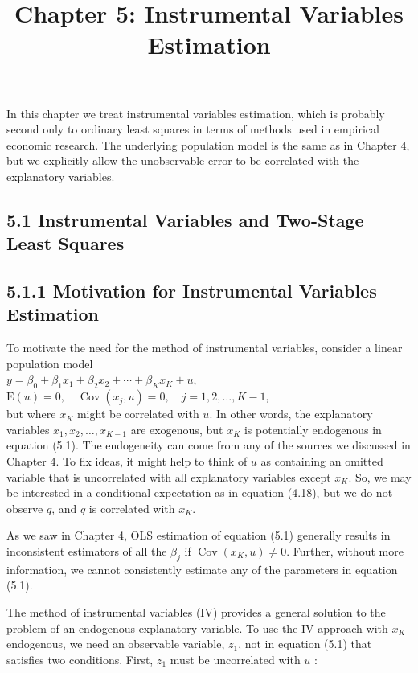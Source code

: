 \documentclass[10pt]{article}
\title{Chapter 5: Instrumental Variables Estimation}
\author{}
\date{}
\begin{document}
\maketitle

In this chapter we treat instrumental variables estimation, which is probably second only to ordinary least squares in terms of methods used in empirical economic research. The underlying population model is the same as in Chapter 4, but we explicitly allow the unobservable error to be correlated with the explanatory variables.

\subsection*{5.1 Instrumental Variables and Two-Stage Least Squares}
\subsection*{5.1.1 Motivation for Instrumental Variables Estimation}
To motivate the need for the method of instrumental variables, consider a linear population model\\
$y=\beta_{0}+\beta_{1} x_{1}+\beta_{2} x_{2}+\cdots+\beta_{K} x_{K}+u$,\\
$\mathrm{E}(u)=0, \quad \operatorname{Cov}\left(x_{j}, u\right)=0, \quad j=1,2, \ldots, K-1$,\\
but where $x_{K}$ might be correlated with $u$. In other words, the explanatory variables $x_{1}, x_{2}, \ldots, x_{K-1}$ are exogenous, but $x_{K}$ is potentially endogenous in equation (5.1). The endogeneity can come from any of the sources we discussed in Chapter 4. To fix ideas, it might help to think of $u$ as containing an omitted variable that is uncorrelated with all explanatory variables except $x_{K}$. So, we may be interested in a conditional expectation as in equation (4.18), but we do not observe $q$, and $q$ is correlated with $x_{K}$.

As we saw in Chapter 4, OLS estimation of equation (5.1) generally results in inconsistent estimators of all the $\beta_{j}$ if $\operatorname{Cov}\left(x_{K}, u\right) \neq 0$. Further, without more information, we cannot consistently estimate any of the parameters in equation (5.1).

The method of instrumental variables (IV) provides a general solution to the problem of an endogenous explanatory variable. To use the IV approach with $x_{K}$ endogenous, we need an observable variable, $z_{1}$, not in equation (5.1) that satisfies two conditions. First, $z_{1}$ must be uncorrelated with $u$ :
\end{document}
